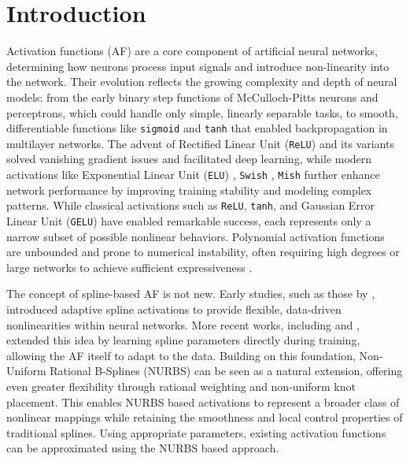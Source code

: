 \documentclass{article}
\begin{document}
\section{Introduction}
Activation functions (AF) are a core component of artificial neural networks, determining how neurons process input 
signals and introduce non-linearity into the network. Their evolution reflects the growing complexity 
and depth of neural models: from the early binary step functions of McCulloch-Pitts \cite{mcculloch1943logical}
neurons and perceptrons, 
which could handle only simple, linearly separable tasks, to smooth, differentiable functions like \texttt{sigmoid} \cite{MINAI1993845}
and \texttt{tanh} \cite{6795724} that enabled backpropagation in multilayer networks. The advent of Rectified Linear Unit (\texttt{ReLU}) \cite{relu} and its variants solved 
vanishing gradient issues and facilitated deep learning, while modern activations like Exponential Linear Unit (\texttt{ELU}) \cite{clevert2016fastaccuratedeepnetwork}, 
\texttt{Swish} \cite{ramachandran2017searchingactivationfunctions}, 
\texttt{Mish} \cite{misra2020mishselfregularizednonmonotonic} 
further enhance network performance by improving training stability and modeling complex patterns.
While classical activations such as \texttt{ReLU}, \texttt{tanh}, and Gaussian Error Linear Unit (\texttt{GELU}) \cite{hendrycks2023gaussianerrorlinearunits}
have enabled remarkable success, each represents only a narrow subset of possible nonlinear behaviors. 
Polynomial activation functions are unbounded and prone to numerical instability, 
often requiring high degrees or large networks to achieve sufficient expressiveness \cite{Hornik1989Multilayer}
\cite{Leshno1993NonPolynomial} \cite{Goodfellow2016DeepLearning}.

The concept of spline-based AF is not new. Early studies, such as those by 
\cite{guarnieri1999multilayer}, introduced adaptive spline activations to provide flexible, 
data-driven nonlinearities within neural networks. 
More recent works, including \cite{hryniowski2018polyneuronautomaticneurondiscovery} and 
\cite{bohra2020learning}, extended this idea by learning spline parameters directly during training, 
allowing the AF itself to adapt to the data. 
Building on this foundation, Non-Uniform Rational B-Splines (NURBS) can be seen as a natural 
extension, offering even greater flexibility through rational weighting and non-uniform knot placement. 
This enables NURBS based activations to represent a broader class of nonlinear mappings while 
retaining the smoothness and local control properties of traditional splines.
Using appropriate parameters, existing activation functions can be approximated using the NURBS based approach.
\end{document}
